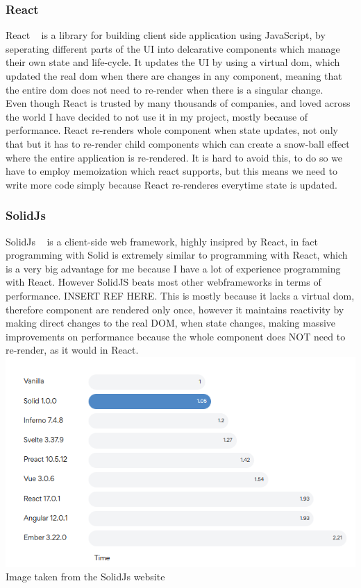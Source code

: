 \documentclass[titlepage]{article}
\begin{document}
\subsubsection{React}
React ~\cite{react} is a library for building client side application using JavaScript, by seperating different parts of the UI into delcarative components which manage their own state and life-cycle. It updates the UI by using a virtual dom, which updated the real dom when there are changes in any component, meaning that the entire dom does not need to re-render when there is a singular change. \\

Even though React is trusted by many thousands of companies, and loved across the world I have decided to not use it in my project, mostly because of performance. React re-renders whole component when state updates, not only that but it has to re-render child components which can create a snow-ball effect where the entire application is re-rendered. It is hard to avoid this, to do so we have to employ memoization which react supports, but this means we need to write more code simply because React re-renderes everytime state is updated. \\

\subsubsection{SolidJs}
SolidJs ~\cite{solid} is a client-side web framework, highly insipred by React, in fact programming with Solid is extremely similar to programming with React, which is a very big advantage for me because I have a lot of experience programming with React. However SolidJS beats most other webframeworks in terms of performance. INSERT REF HERE. This is mostly because it lacks a virtual dom, therefore component are rendered only once, however it maintains reactivity by making direct changes to the real DOM, when state changes, making massive improvements on performance because the whole component does NOT need to re-render, as it would in React. \\

\includegraphics[width=1\textwidth]{solidjs_perf.png}
Image taken from the SolidJs website ~\cite{solid} \\
\end{document}
